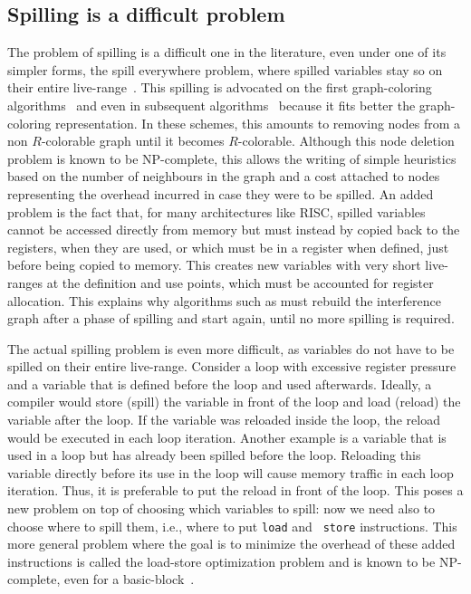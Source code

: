 {


\subsection{Spilling is a difficult problem}

The problem of spilling is a difficult one in the literature, even under one of 
its simpler forms, the spill everywhere problem, where spilled variables stay 
so on their entire live-range~\cite{todo}. This spilling is advocated on the 
first graph-coloring algorithms~\cite{Chaitin81} and even in subsequent 
algorithms~\cite{IRC} because it fits better the graph-coloring representation. 
In these schemes, this amounts to removing nodes from a non $R$-colorable graph 
until it becomes $R$-colorable. Although this node deletion problem is known to 
be NP-complete, this allows the writing of simple heuristics based on the 
number of neighbours in the graph and a cost attached to nodes representing the 
overhead incurred in case they were to be spilled. An added problem is the fact 
that, for many architectures like RISC, spilled variables cannot be accessed 
directly from memory but must instead by copied back to the registers, when 
they are used, or which must be in a register when defined, just before being 
copied to memory. This creates new variables with very short live-ranges at the 
definition and use points, which must be accounted for register allocation. 
This explains why algorithms such as \irc must rebuild the interference graph 
after a phase of spilling and start again, until no more spilling is required.


The actual spilling problem is even more difficult, as variables do not have to 
be spilled on their entire live-range.
Consider a loop with excessive register pressure and a variable that is defined 
before the loop and used afterwards. Ideally, a compiler would store (spill) 
the variable in front of the loop and load (reload) the variable after the 
loop. If the variable was reloaded inside the loop, the reload would be 
executed in each loop iteration. Another example is a variable that is used in 
a loop but has already been spilled before the loop. Reloading this variable 
directly before its use in the loop will cause memory traffic in each loop 
iteration. Thus, it is preferable to put the reload in front of the loop.
This poses a new problem on top of choosing which variables to spill: now we 
need also to choose where to spill them, i.e., where to put {\tt load} and {\tt 
store} instructions. This more general problem where the goal is to minimize 
the overhead of these added instructions is called the load-store optimization 
problem and is known to be NP-complete, even for a 
basic-block~\cite{Liberatore00}.  


}
